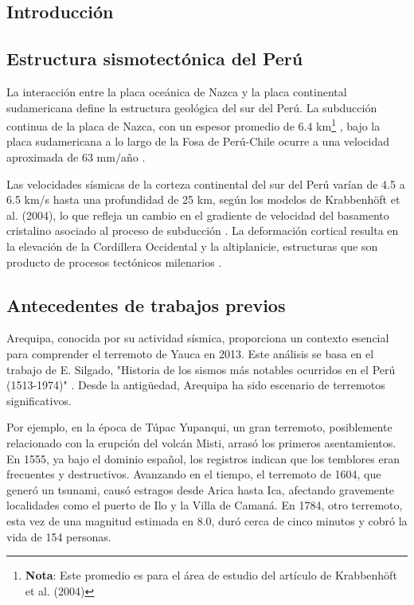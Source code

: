 \documentclass[a4paper,11pt]{article}
\begin{document}
\subsection{Introducción}

\subsection*{Estructura sismotectónica del Perú}

La interacción entre la placa oceánica de Nazca y la placa continental sudamericana define la estructura geológica del sur del Perú. La subducción continua de la placa de Nazca, con un espesor promedio de 6.4 km\footnote{\textbf{Nota}: Este promedio es para el área de estudio del artículo de Krabbenhöft et al. (2004)} \cite{Krabbenhoft2004}, bajo la placa sudamericana a lo largo de la Fosa de Perú-Chile \cite{Krabbenhoft2004} ocurre a una velocidad aproximada de 63 mm/año \cite{VillegasLanza2016}.

Las velocidades sísmicas de la corteza continental del sur del Perú varían de 4.5 a 6.5 km/s hasta una profundidad de 25 km, según los modelos de Krabbenhöft et al. (2004), lo que refleja un cambio en el gradiente de velocidad del basamento cristalino asociado al proceso de subducción \cite{Krabbenhoft2004}. La deformación cortical resulta en la elevación de la Cordillera Occidental y la altiplanicie, estructuras que son producto de procesos tectónicos milenarios \cite{VillegasLanza2016}.

\subsection*{Antecedentes de trabajos previos}

Arequipa, conocida por su actividad sísmica, proporciona un contexto esencial para comprender el terremoto de Yauca en 2013. Este análisis se basa en el trabajo de E. Silgado, "Historia de los sismos más notables ocurridos en el Perú (1513-1974)" \cite{silgado_ferro_historia_1978}. Desde la antigüedad, Arequipa ha sido escenario de terremotos significativos.

Por ejemplo, en la época de Túpac Yupanqui, un gran terremoto, posiblemente relacionado con la erupción del volcán Misti, arrasó los primeros asentamientos. En 1555, ya bajo el dominio español, los registros indican que los temblores eran frecuentes y destructivos. Avanzando en el tiempo, el terremoto de 1604, que generó un tsunami, causó estragos desde Arica hasta Ica, afectando gravemente localidades como el puerto de Ilo y la Villa de Camaná. En 1784, otro terremoto, esta vez de una magnitud estimada en 8.0, duró cerca de cinco minutos y cobró la vida de 154 personas.
\end{document}
